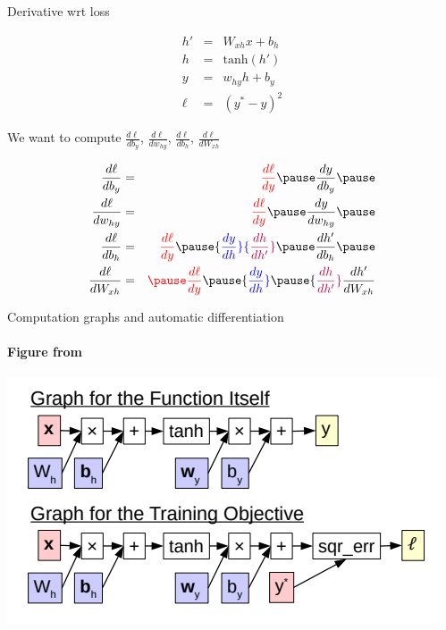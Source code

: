 \begin{frame}[shrink=5]{Derivative wrt loss}
\begin{block}{}
	\begin{eqnarray*}
		h' &=& W_{xh} x + b_h \\
		h &=& \text{tanh}(h') \\
		y &=& w_{hy} h + b_y \\
		\ell &=& (y^\ast - y)^2
	\end{eqnarray*}
	
	We want to compute $\frac{d \ell}{d b_y}$, $\frac{d \ell}{d w_{hy}}$, $\frac{d \ell}{d b_h}$, $\frac{d \ell}{d W_{xh}}$
\end{block}
\pause
\begin{block}{}
	\begin{eqnarray*}
		\frac{d \ell}{d b_y} &=& {\color{red} \frac{d \ell}{d y}} \pause \frac{d y}{d b_y} \pause \\
		\frac{d \ell}{d w_{hy}} &=& {\color{red} \frac{d \ell}{d y}} \pause \frac{d y}{d w_{hy}} \pause \\
		\frac{d \ell}{d b_h} &=& {\color{red} \frac{d \ell}{d y}} \pause {\color{blue} \frac{d y}{d h}} {\color{purple} \frac{d h}{d h'}} \pause \frac{d h'}{d b_h} \pause \\
		\frac{d \ell}{d W_{xh}} &=& {\color{red} \pause \frac{d \ell}{d y}} \pause {\color{blue} \frac{d y}{d h}} \pause {\color{purple} \frac{d h}{d h'}}\frac{d h'}{d W_{xh}} 
	\end{eqnarray*}
\end{block}

\end{frame}

\begin{frame}{Computation graphs and automatic differentiation}
\framesubtitle{Figure from \cite{Neubig2018}}
\includegraphics[scale=0.5]{figures/ff/compgraph.png}
\end{frame}

